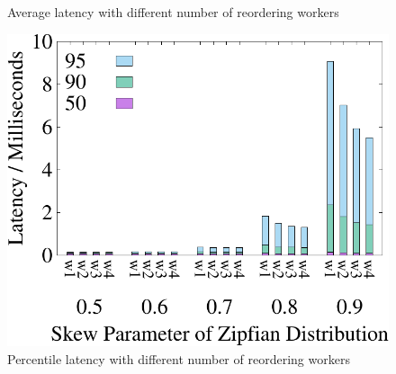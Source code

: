 \begin{figure}[t]
\begin{minipage}[b]{0.31\linewidth}
		\caption{Average latency with different number of reordering workers}
		\label{fig:reorder:latency}
	\end{minipage}    
	\begin{minipage}[b]{0.31\linewidth}
		\centering
		\includegraphics[width=\textwidth]{./exp_fig/reorder/percent95_latency}
		\caption{Percentile latency with different number of reordering workers}
		\label{fig:reorder:p95}
	\end{minipage}    
\end{figure}


